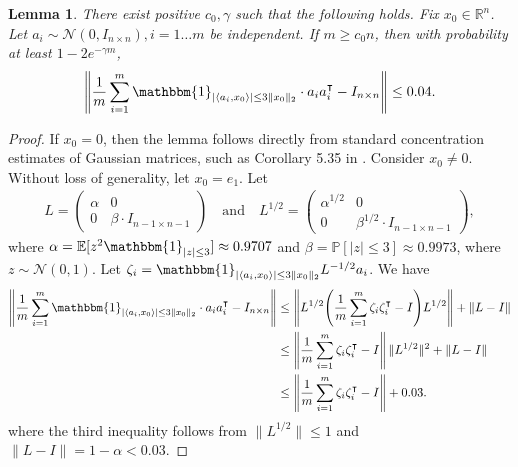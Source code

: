 \documentclass[12pt]{article}
\newcommand{\1}{\mathbbm{1}}
\newcommand{\xo}{x_0}
\newcommand{\R}{\mathbb{R}}
\newcommand{\inddefwithnorm}{\mathbbm{1}_{|\langle a_i, \xo \rangle| \leq 3 \| \xo \|_2}}
\newcommand{\PP}{\mathbb{P}}
\newcommand{\aiai}{a_i a_i^\intercal}
\newcommand{\zetaizetai}{\zeta_i \zeta_i^\intercal}
\newtheorem{lemma}[theorem]{Lemma}
\begin{document}
\begin{lemma} \label{lem:aiai-concentration-ind}
There exist positive $c_0, \gamma$ such that the following holds.  Fix $\xo \in \R^n$.  Let $a_i \sim \mathcal{N}(0, I_{n \times n}), i = 1 \ldots m$ be independent.  If $m \geq c_0 n$, then with probability at least $1 - 2 e^{-\gamma m}$,
\begin{align*}
\left \| \frac{1}{m} \sum_{i=1}^m \inddefwithnorm \cdot \aiai - I_{n \times n}\right \| \leq 0.04.
\end{align*}
\end{lemma}
\begin{proof}
If $\xo = 0$, then the lemma follows directly from standard concentration estimates of Gaussian matrices, such as Corollary 5.35 in \cite{V2012}.  Consider $\xo \neq 0$.  Without loss of generality, let $\xo = e_1$. Let
\begin{align*}
L= \begin{pmatrix}\alpha & 0 \\ 0 & \beta \cdot I_{n-1 \times n-1} \end{pmatrix} \quad \text{and} \quad L^{1/2} = \begin{pmatrix}\alpha^{1/2} & 0 \\ 0 & \beta^{1/2} \cdot I_{n-1 \times n-1} \end{pmatrix},
\end{align*}
where $\alpha = \mathbb{E}[z^2 \1_{|z| \leq 3}] \approx 0.9707$ and $\beta = \PP[|z| \leq 3] \approx 0.9973$, where $z \sim \mathcal{N}(0, 1)$. 
Let $\zeta_i = \inddefwithnorm L^{-1/2} a_i$.  We have
\begin{align}
\left \| \frac{1}{m} \sum_{i=1}^m \inddefwithnorm \cdot \aiai - I_{n \times n}\right \|  &\leq \left \| L^{1/2}  \Biggl( \frac{1}{m} \sum_{i=1}^m \zetaizetai - I \Biggr) L^{1/2}\right \| + \|L  - I\|  \notag \\
&\leq \left \|    \frac{1}{m} \sum_{i=1}^m \zetaizetai - I  \right \| \|L^{1/2}\|^2 + \| L - I\|  \notag \\
& \leq \left \|   \frac{1}{m} \sum_{i=1}^m \zetaizetai - I  \right \| + 0.03. \label{eq:indaiai}
\end{align}
where the third inequality follows from $\|L^{1/2}\| \leq 1$ and $\|L-I \| = 1-\alpha < 0.03$.  


\end{proof}
\end{document}
